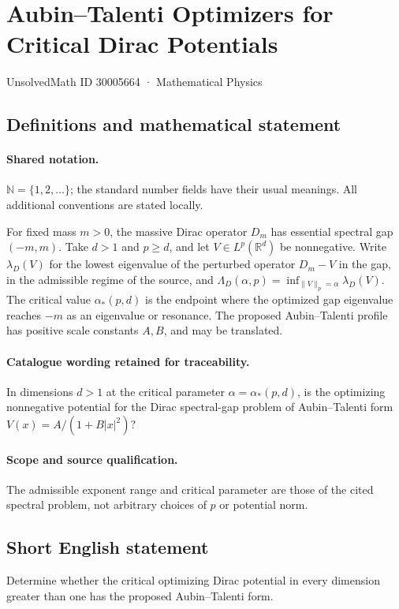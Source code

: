 \documentclass[11pt]{article}
\begin{document}
\setcounter{section}{30005663}
\section{Aubin–Talenti Optimizers for Critical Dirac Potentials}\label{30005664}
{\small UnsolvedMath ID 30005664 · Mathematical Physics}
\subsection{Definitions and mathematical statement}

\paragraph{Shared notation.}$\mathbb N=\{1,2,\ldots\}$; the standard number fields have their usual meanings. All additional conventions are stated locally.


For fixed mass $m>0$, the massive Dirac operator $D_m$ has essential spectral gap $(-m,m)$. Take $d>1$ and $p\geq d$, and let $V\in L^p(\mathbb R^d)$ be nonnegative. Write $\lambda_D(V)$ for the lowest eigenvalue of the perturbed operator $D_m-V$ in the gap, in the admissible regime of the source, and $\Lambda_D(\alpha,p)=\inf_{\|V\|_p=\alpha}\lambda_D(V)$. The critical value $\alpha_*(p,d)$ is the endpoint where the optimized gap eigenvalue reaches $-m$ as an eigenvalue or resonance. The proposed Aubin--Talenti profile has positive scale constants $A,B$, and may be translated.

\paragraph{Catalogue wording retained for traceability.}
In dimensions $d>1$ at the critical parameter $\alpha=\alpha_*(p,d)$, is the optimizing nonnegative potential for the Dirac spectral-gap problem of Aubin–Talenti form $V(x)=A/(1+B|x|^2)$?

\paragraph{Scope and source qualification.}The admissible exponent range and critical parameter are those of the cited spectral problem, not arbitrary choices of $p$ or potential norm.
\subsection{Short English statement}
Determine whether the critical optimizing Dirac potential in every dimension greater than one has the proposed Aubin--Talenti form.
\end{document}
